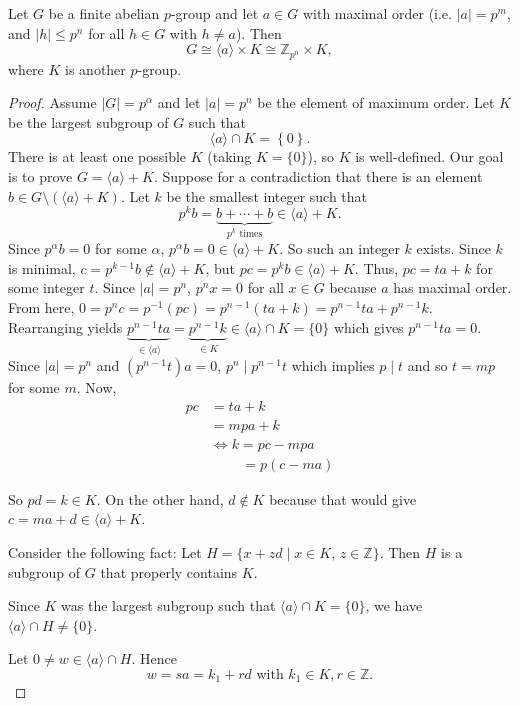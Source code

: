 \begin{lemma}
	Let $G$ be a finite abelian $p$-group and let $a\in G$ with maximal order (i.e. $|a|=p^m$, and $|h|\leq p^n$ for all $h\in G$ with $h\neq a$). Then
	$$G\cong\langle a\rangle\times K\cong\mathbb Z_{p^n}\times K,$$
	where $K$ is another $p$-group.
\end{lemma}

\begin{proof}
	Assume $|G|=p^\alpha$ and let $|a|=p^n$ be the element of maximum order. Let $K$ be the largest subgroup of $G$ such that
	$$\langle a\rangle \cap K=\left\{0\right\}.$$
	There is at least one possible $K$ (taking $K=\{0\}$), so $K$ is well-defined. Our goal is to prove $G=\langle a\rangle +K$. Suppose for a contradiction that there is an element $b\in G\setminus(\langle a\rangle +K)$. Let $k$ be the smallest integer such that
	$$p^kb=\underbrace{b+\cdots+b}_{\text{$p^k$ times}}\in \langle a\rangle +K.$$
	Since $p^\alpha b=0$ for some $\alpha$, $p^\alpha b=0\in \langle a\rangle +K$. So such an integer $k$ exists. Since $k$ is minimal, $c=p^{k-1}b\not\in \langle a\rangle +K$, but $pc=p^kb\in \langle a\rangle +K$. Thus, $pc=ta+k$ for some integer $t$. Since $|a|=p^n$, $p^nx=0$ for all $x\in G$ because $a$ has maximal order. From here, $0=p^nc=p^{-1}(pc)=p^{n-1}(ta+k)=p^{n-1}ta+p^{n-1}k$. Rearranging yields $\underbrace{p^{n-1}ta}_{\in\langle a\rangle}=\underbrace{p^{n-1}k}_{\in K}\in\langle a\rangle \cap K=\{0\}$ which gives $p^{n-1}ta=0$. Since $|a|=p^n$ and $(p^{n-1}t)a=0$, $p^n\mid p^{n-1}t$ which implies $p\mid t$ and so $t=mp$ for some $m$. Now,
	\begin{align*}
		pc&=ta+k\\
		&=mpa+k\\
		&\Leftrightarrow k=pc-mpa\\
		&\phantom{\Leftrightarrow k}\,=p(c-ma)
	\end{align*}

	So $pd=k\in K$. On the other hand, $d\not\in K$ because that would give $c=ma+d\in\langle a\rangle +K$.

	Consider the following fact: Let $H=\{x+zd\mid x\in K,\, z\in\mathbb Z\}$. Then $H$ is a subgroup of $G$ that properly contains $K$.

	Since $K$ was the largest subgroup such that $\langle a\rangle \cap K=\{0\}$, we have $\langle a\rangle \cap H\neq\{0\}$.

	Let $0\neq w\in \langle a\rangle \cap H$. Hence
	\begin{equation*}
		w=sa=k_1+rd\text{ with }k_1\in K,r\in\mathbb Z.
	\end{equation*}


\end{proof}
